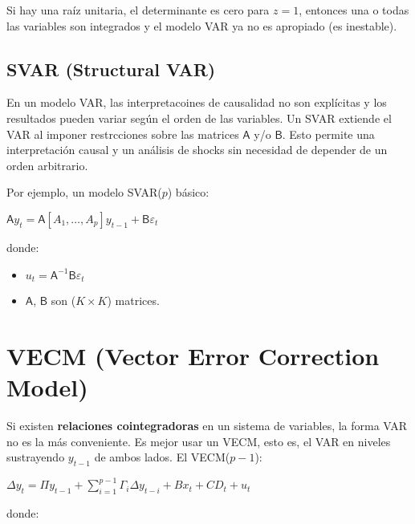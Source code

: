 \documentclass[10pt, a4paper, landscape]{article}
\begin{document}
\begin{multicols}{2}
		Si hay una raíz unitaria, el determinante es cero para $z = 1$, entonces una o todas las variables son integrados y el modelo VAR ya no es apropiado (es inestable).
		
		\subsection*{SVAR (Structural VAR)}
		
		En un modelo VAR, las interpretacoines de causalidad no son explícitas y los resultados pueden variar según el orden de las variables. Un SVAR extiende el VAR al imponer restrcciones sobre las matrices $\mathsf{A}$ y/o $\mathsf{B}$. Esto permite una interpretación causal y un análisis de shocks sin necesidad de depender de un orden arbitrario.
		
		Por ejemplo, un modelo SVAR($p$) básico:
		
		\begin{center}
			$\mathsf{A} y_t = \mathsf{A} [A_1, \ldots, A_p] y_{t - 1} + \mathsf{B} \varepsilon_t$
		\end{center}
		
		donde:
		
		\begin{itemize}[leftmargin=*]
			\item $u_t = \mathsf{A}^{-1} \mathsf{B} \varepsilon_t$
			\item $\mathsf{A}$, $\mathsf{B}$ son ($K \times K$) matrices.
		\end{itemize}
		
		\columnbreak
		
		\section*{VECM (Vector Error Correction Model)}
		
		Si existen \textbf{relaciones cointegradoras} en un sistema de variables, la forma VAR no es la más conveniente. Es mejor usar un VECM, esto es, el VAR en niveles sustrayendo $y_{t - 1}$ de ambos lados. El VECM($p - 1$):
		
		\begin{center}
			$\Delta y_{t} = \Pi y_{t - 1} + \sum_{i = 1}^{p - 1} \Gamma_{i} \Delta y_{t - i} + B x_{t} + CD_{t} + u_{t}$
		\end{center}
		
		donde:
		

\end{multicols}
\end{document}
